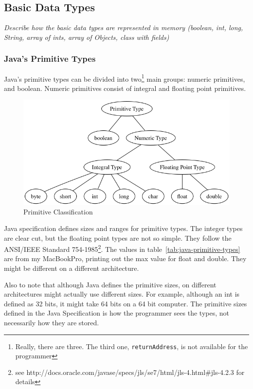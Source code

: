 \subsection{Basic Data Types}
\textit{Describe how the basic data types are represented in memory (boolean, int, long, String, array of ints, array of Objects, class with fields)}
\subsubsection{Java's Primitive Types} 
Java's primitive types can be divided into two\footnote{Really, there are three. The third one, \texttt{returnAddress}, is not available for the programmer} main groups: numeric primitives, and boolean. Numeric primitives consist of integral and floating point primitives.\cite{gosling}

\begin{figure}[H]\centering
\includegraphics[width=\linewidth]{primitives.png}
\caption{Primitive Classification}
\label{fig:results}
\end{figure}

Java specification\cite{gosling} defines sizes and ranges for primitive types. The integer types are clear cut, but the floating point types are not so simple. They follow the ANSI/IEEE Standard 754-1985\footnote{see http://docs.oracle.com/javase/specs/jls/se7/html/jls-4.html\#jls-4.2.3 for details}. The values in table~\ref{tab:java-primitive-types} are from my MacBookPro, printing out the max value for float and double. They might be different on a different architecture.

Also to note that although Java defines the primitive sizes, on different architectures might actually use different sizes. For example, although an int is defined as 32 bits, it might take 64 bits on a 64 bit computer. The primitive sizes defined in the Java Specification is how the programmer sees the types, not necessarily how they are stored.

